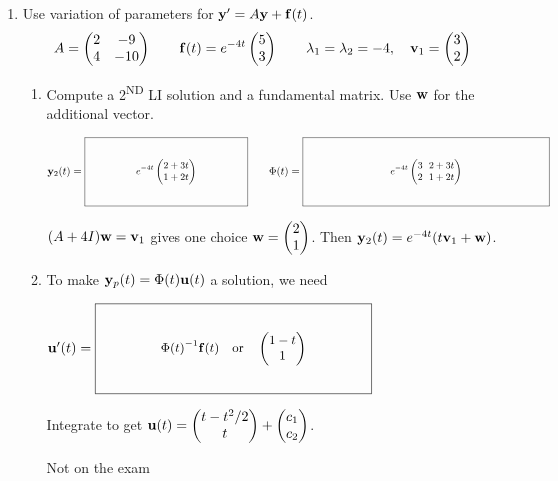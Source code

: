 \documentclass[11pt,letterpaper]{article}
\newcommand{\keybox}[3]{%
  \vcenter{\hbox{$\boxed{\parbox[c][#2][c]{#1}{\centering\small
    \setlength{\arraycolsep}{3pt}\ensuremath{\displaystyle #3}}}$}}}
\begin{document}
\begin{enumerate}
\newpage
\setlength{\parskip}{3pt}
\item Use variation of parameters for $\mathbf{y}'=A\mathbf{y}+\mathbf{f}(t)$.
\[
A=\begin{pmatrix}2&-9\\4&-10\end{pmatrix}
\qquad
\mathbf{f}(t)=e^{-4t}\begin{pmatrix}5\\3\end{pmatrix}
\qquad
\lambda_1=\lambda_2=-4,\quad
\mathbf{v}_1=\begin{pmatrix}3\\2\end{pmatrix}
\]
\begin{enumerate}
\item Compute a 2\textsuperscript{ND} LI solution and a fundamental matrix. Use $\mathbf{w}$ for the additional vector.
\par $\vect{y}_2(t)=\keybox{2.05in}{0.80in}{e^{-4t}\begin{pmatrix}2+3t\\1+2t\end{pmatrix}}
\qquad\Phi(t)=\keybox{3.15in}{0.80in}{e^{-4t}\begin{pmatrix}3&2+3t\\2&1+2t\end{pmatrix}}$
\par{\footnotesize $(A+4I)\mathbf{w}=\mathbf{v}_1$ gives one choice $\mathbf{w}=\begin{pmatrix}2\\1\end{pmatrix}$. Then $\mathbf{y}_2(t)=e^{-4t}(t\mathbf{v}_1+\mathbf{w})$.}
\item To make $\mathbf{y}_p(t)=\Phi(t)\mathbf{u}(t)$ a solution, we need
\par $\vect{u}'(t)=\keybox{2.65in}{0.80in}{\Phi(t)^{-1}\vect{f}(t)\quad\text{or}\quad\begin{pmatrix}1-t\\1\end{pmatrix}}$
\par{\footnotesize Integrate to get
$\mathbf{u}(t)=\begin{pmatrix}t-t^2/2\\t\end{pmatrix}+\begin{pmatrix}c_1\\c_2\end{pmatrix}$.}
\par\vfill
\noindent Not on the exam\par

\end{enumerate}
\end{enumerate}
\end{document}

